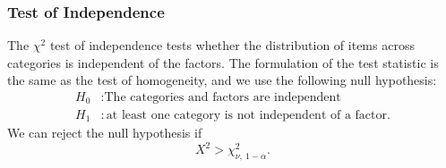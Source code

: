\documentclass{article}
\begin{document}
\subsubsection{Test of Independence}
The \(\chi^2\) test of independence tests whether the distribution of items across categories is independent of the
factors. The formulation of the test statistic is the same as the test of homogeneity, and we use the following
null hypothesis:
\begin{align*}
    H_0 & : \text{The categories and factors are independent}            \\
    H_1 & : \text{at least one category is not independent of a factor}.
\end{align*}
We can reject the null hypothesis if
\begin{equation*}
    X^2 > \chi_{\nu, \: 1 - \alpha}^2.
\end{equation*}
\end{document}
